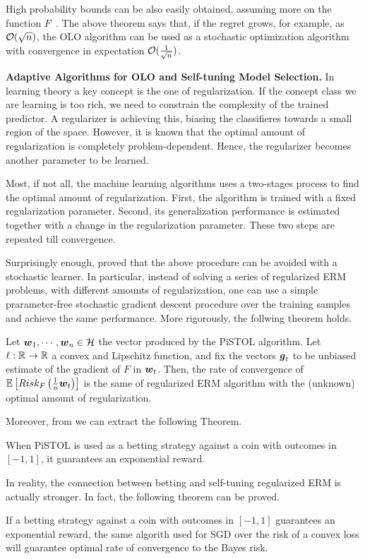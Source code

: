 High probability bounds can be also easily obtained, assuming more on the function $F$~\citep{Cesa-BianchiCG04}.
The above theorem says that, if the regret grows, for example, as $\mathcal{O}(\sqrt{n})$, the OLO algorithm can be used as a stochastic optimization algorithm with convergence in expectation $\mathcal{O}(\frac{1}{\sqrt{n}})$.

\textbf{Adaptive Algorithms for OLO and Self-tuning Model Selection.}
In learning theory a key concept is the one of regularization. If the concept class we are learning is too rich, we need to constrain the complexity of the trained predictor. A regularizer is achieving this, biasing the classifieres towards a small region of the space. However, it is known that the optimal amount of regularization is completely problem-dependent. Hence, the regularizer becomes another parameter to be learned.

Most, if not all, the machine learning algorithms uses a two-stages process to find the optimal amount of regularization. First, the algorithm is trained with a fixed regularization parameter. Second, its generalization performance is estimated together with a change in the regularization parameter. These two steps are repeated till convergence.

Surprisingly enough, \citep{Orabona14} proved that the above procedure can be avoided with a stochastic learner. In particular, instead of solving a series of regularized ERM problems, with different amounts of regularization, one can use a simple prarameter-free stochastic gradient descent procedure over the training samples and achieve the same performance.
More rigorously, the follwing theorem holds.
\begin{theorem}
Let $\boldsymbol{w}_1, \cdots, \boldsymbol{w}_n \in \mathcal{H}$ the vector produced by the PiSTOL algorithm.
Let $\ell:\mathbb{R}\rightarrow\mathbb{R}$ a convex and Lipschitz function, and fix the vectors $\boldsymbol{g}_t$ to be unbiased estimate of the gradient of $F$ in $\boldsymbol{w}_t$. Then, the rate of convergence of $\mathbb{E}\left[Risk_F\left(\frac{1}{n} \boldsymbol{w}_t\right)\right]$ is the same of regularized ERM algorithm with the (unknown) optimal amount of regularization.
\end{theorem}

Moreover, from \citep{} we can extract the following Theorem.
\begin{theorem}
When PiSTOL is used as a betting strategy against a coin with outcomes in $[-1,1]$, it guarantees an exponential reward.
\end{theorem}

In reality, the connection between betting and self-tuning regularized ERM is actually stronger. In fact, the following theorem can be proved.
\begin{theorem}
If a betting strategy against a coin with outcomes in $[-1,1]$ guarantees an exponential reward, the same algorith used for SGD over the risk of a convex loss will guarantee optimal rate of convergence to the Bayes risk.
\end{theorem}

